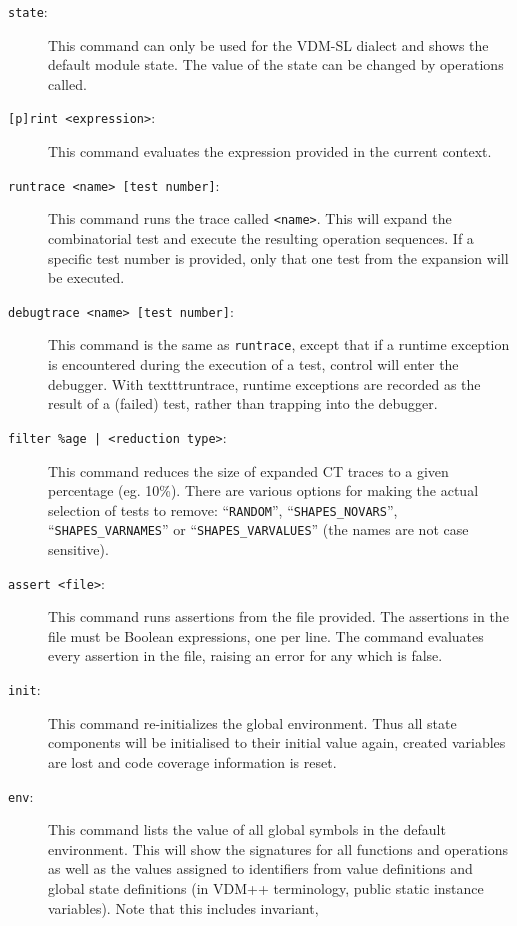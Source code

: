 \documentclass{overturerepchap}
\begin{document}
\begin{description}
\item[\texttt{state}:] This command can only be used for the VDM-SL
  dialect and shows the default module state.  
  The value of the state can be changed by operations called.
\item[\texttt{[p]rint <expression>}:] This command evaluates the
  expression provided in the current context.     
\item[\texttt{runtrace <name> [test number]}:] This command runs the trace called
  \texttt{<name>}. This will expand the combinatorial
  test and execute the resulting
  operation sequences. If a specific test number is provided, only
  that one test from the expansion will be executed. 
\item[\texttt{debugtrace <name> [test number]}:] This command is the same as
  \texttt{runtrace}, except that if a runtime exception is encountered during
  the execution of a test, control will enter the debugger. With texttt{runtrace},
  runtime exceptions are recorded as the result of a (failed) test, rather than
  trapping into the debugger.
\item[\texttt{filter \%age | <reduction type>}:] This command reduces
  the size of expanded CT traces to a given percentage (eg. 10\%).
  There are various options for making the actual selection of tests to remove:
  ``\texttt{RANDOM}'', ``\texttt{SHAPES\_NOVARS}'', ``\texttt{SHAPES\_VARNAMES}''
   or ``\texttt{SHAPES\_VARVALUES}'' (the names are not case sensitive).
\item[\texttt{assert <file>}:] This command runs assertions from the
  file provided. The assertions in the file must be Boolean
  expressions, one per line. The command evaluates every assertion in
  the file, raising an error for any which is false.  
\item[\texttt{init}:] This command re-initializes the global
  environment. Thus all state components will be initialised to their
  initial value again, created variables are lost and code coverage information
  is reset. 
\item[\texttt{env}:] This command lists the value of all global symbols
  in the default environment. This will show the signatures for all
  functions and operations as well as the values assigned to
  identifiers from value definitions and global state definitions (in VDM++
  terminology, public static instance variables). Note that this includes invariant,

\end{description}
\end{document}
